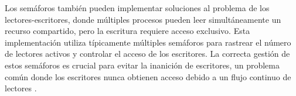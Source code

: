 {Los semáforos también pueden implementar soluciones al problema de los lectores-escritores, donde múltiples procesos pueden leer simultáneamente un recurso compartido, pero la escritura requiere acceso exclusivo. Esta implementación utiliza típicamente múltiples semáforos para rastrear el número de lectores activos y controlar el acceso de los escritores. La correcta gestión de estos semáforos es crucial para evitar la inanición de escritores, un problema común donde los escritores nunca obtienen acceso debido a un flujo continuo de lectores \cite{silberschatz2018operating}.


}

